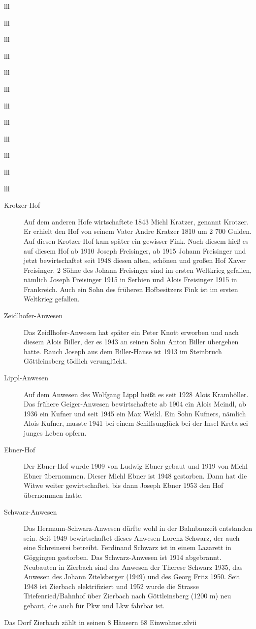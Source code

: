 \documentclass[12pt,a4pager]{book}
\begin{document}
\begin{tabuluar}{lll}
\begin{tabuluar}{lll}
\begin{tabuluar}{lll}
\begin{tabuluar}{lll}
\begin{tabuluar}{lll}
\begin{tabuluar}{lll}
\begin{tabuluar}{lll}
\begin{tabuluar}{lll}
\begin{tabuluar}{lll}
\begin{tabuluar}{lll}
\begin{tabuluar}{lll}
\begin{tabuluar}{lll}
\begin{description}
\item[Krotzer-Hof] Auf dem anderen Hofe wirtschaftete 1843 Michl Kratzer,
genannt Krotzer. Er erhielt den Hof von seinem Vater Andre Kratzer 1810 um 2 700
Gulden. Auf diesen Krotzer-Hof kam später ein gewisser Fink. Nach diesem hieß es
auf diesem Hof ab 1910 Joseph Freisinger, ab 1915 Johann Freisinger und jetzt
bewirtschaftet seit 1948 diesen alten, schönen und großen Hof Xaver Freisinger.
2 Söhne des Johann Freisinger sind im ersten Weltkrieg gefallen, nämlich Joseph
Freisinger 1915 in Serbien und Alois Freisinger 1915 in Frankreich. Auch ein
Sohn des früheren Hofbesitzers Fink ist im ersten Weltkrieg gefallen.

\item[Zeidlhofer-Anwesen] Das Zeidlhofer-Anwesen hat später ein Peter Knott
erworben und nach diesem Alois Biller, der es 1943 an seinen Sohn Anton Biller
übergehen hatte. Rauch Joseph aus dem Biller-Hause ist 1913 im Steinbruch
Göttleinsberg tödlich verunglückt.

\item[Lippl-Anwesen] Auf dem Anwesen des Wolfgang Lippl heißt es seit 1928 Alois
Kramhöller. Das frühere Geiger-Anwesen bewirtschaftete ab 1904 ein Alois Meindl,
ab 1936 ein Kufner und seit 1945 ein Max Weikl. Ein Sohn Kufners, nämlich Alois
Kufner, musste 1941 bei einem Schiffsunglück bei der Insel Kreta sei junges
Leben opfern.

\item[Ebner-Hof] Der Ebner-Hof wurde 1909 von Ludwig Ebner gebaut und 1919 von
Michl Ebner übernommen. Dieser Michl Ebner ist 1948 gestorben. Dann hat die
Witwe weiter gewirtschaftet, bis dann Joseph Ebner 1953 den Hof übernommen
hatte.

\item[Schwarz-Anwesen] Das Hermann-Schwarz-Anwesen dürfte wohl in der
Bahnbauzeit entstanden sein. Seit 1949 bewirtschaftet dieses Anwesen Lorenz
Schwarz, der auch eine Schreinerei betreibt. Ferdinand Schwarz ist in einem
Lazarett in Göggingen gestorben. Das Schwarz-Anwesen ist 1914 abgebrannt.
Neubauten in Zierbach sind das Anwesen der Therese Schwarz 1935, das Anwesen des
Johann Zitelsberger (1949) und des Georg Fritz 1950. Seit 1948 ist Zierbach
elektrifiziert und 1952 wurde die Strasse Triefenried/Bahnhof über Zierbach nach
Göttleinsberg (1200 m) neu gebaut, die auch für Pkw und Lkw fahrbar ist.
\end{description}

Das Dorf Zierbach zählt in seinen 8 Häusern 68 Einwohner.xlvii


\end{tabuluar}
\end{tabuluar}
\end{tabuluar}
\end{tabuluar}
\end{tabuluar}
\end{tabuluar}
\end{tabuluar}
\end{tabuluar}
\end{tabuluar}
\end{tabuluar}
\end{tabuluar}
\end{tabuluar}
\end{document}
